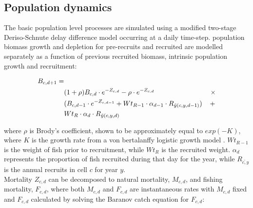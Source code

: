 \documentclass[review]{elsarticle}
\begin{document}

\subsection{Population dynamics}

The basic population level processes are simulated using a modified two-stage
Deriso-Schnute delay difference model \citep{Deriso1980, Schnute1985,
	Dichmont2003} occurring at a daily time-step. 
 population
biomass growth and depletion for pre-recruits and 
recruited   are modelled
separately as a function of previous recruited biomass, intrinsic population
growth and recruitment:

\begin{equation*}
	\begin{split}
	B_{c,d+1} = &\\
	& (1 + \rho) B_{c,d} \cdot e^{-Z_{c,d}} - \rho \cdot e^{-Z_{c,d}} \hspace{2.9cm}
	\times \\  
	& (B_{c,d-1} \cdot e^{-Z_{c,d-1}} + Wt_{R-1} \cdot \alpha_{d-1} \cdot
	R_{\tilde{y}(c,y,d-1)})
	\hspace{0.4cm} + \\
	& Wt_{R} \cdot \alpha_{d} \cdot R_{\tilde{y}(c,y,d)} 
	\end{split}
\end{equation*}

where $\rho$ is Brody's coefficient, shown to be approximately equal to
$exp(-K)$, where $K$ is the growth rate from a von bertalanffy logistic growth
model \citep{Schnute1985}. $Wt_{R-1}$ is the weight of fish prior to
recruitment, while $Wt_{R}$ is the recruited weight. $\alpha_{d}$ represents
the proportion of fish recruited during that day for the year, while
$R_{\tilde{c,y}}$ is the annual recruits in cell $c$ for year $y$. \\

Mortality $Z_{c,d}$ can be decomposed to natural mortality, $M_{c,d}$, and
fishing mortality, $F_{c,d}$, where both $M_{c,d}$ and $F_{c,d}$ are
instantaneous rates with $M_{c,d}$ fixed and $F_{c,d}$ calculated by solving
the Baranov catch equation \citep{Hilborn1992b} for $F_{c,d}$:
\end{document}
